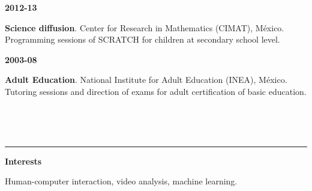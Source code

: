 \documentclass[10 pt]{article}
\newcommand{\mypartitle}[2][2.]{\vspace*{-#1 ex}~\\{\noindent {\bf #2}}}
\begin{document}
\begin{minipage}[t][.7cm]{0.1\textwidth}

\hspace{-.5cm}\textbf{2012-13}

\end{minipage}\begin{minipage}[t][.7cm]{0.87\textwidth}

\textbf{Science diffusion}. Center for Research in Mathematics (CIMAT), México.
Programming sessions of SCRATCH for children at secondary school level.

\end{minipage}
\medskip

\begin{minipage}[t][.7cm]{0.1\textwidth}

\hspace{-.5cm}\textbf{2003-08}

\end{minipage}\begin{minipage}[t][.7cm]{0.87\textwidth}

\textbf{Adult Education}. National Institute for Adult Education (INEA), México.
Tutoring sessions and direction of exams for adult certification of basic education.

\end{minipage}\\

\medskip
\medskip

\mypartitle{Research}
\medskip
\hrule
\medskip

\begin{minipage}{0.1\textwidth}

\textbf{Interests}

\end{minipage}\begin{minipage}{0.9\textwidth}

Human-computer interaction, video analysis, machine learning.

\end{minipage}
\end{document}
